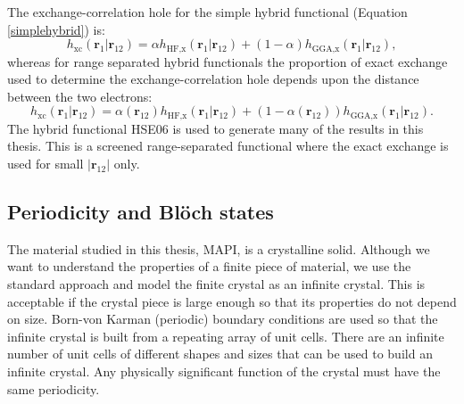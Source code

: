 The exchange-correlation hole for the simple hybrid functional (Equation \ref{simplehybrid}) is:\autocite{Henderson2008}
\begin{equation}
h_\mathrm{xc}(\mathbf{r}_1|\mathbf{r}_{12}) = \alpha h_{\textrm{HF,x}}(\mathbf{r}_1|\mathbf{r}_{12})+ \left(1-\alpha\right)h_{\textrm{GGA,x}}(\mathbf{r}_1|\mathbf{r}_{12}),
\end{equation}
whereas for range separated hybrid functionals the proportion of exact exchange used to determine the exchange-correlation hole depends upon the distance between the two electrons:\autocite{Henderson2008}
\begin{equation}
h_\mathrm{xc}(\mathbf{r}_1|\mathbf{r}_{12}) = \alpha(\mathbf{r}_{12}) h_{\textrm{HF,x}}(\mathbf{r}_1|\mathbf{r}_{12})+ \left(1-\alpha(\mathbf{r}_{12})\right)h_{\textrm{GGA,x}}(\mathbf{r}_1|\mathbf{r}_{12}).
\end{equation}
The hybrid functional HSE06\autocite{Heyd2003} is used to generate many of the results in this thesis. This is a screened range-separated functional where the exact exchange is used for small $\lvert\mathbf{r}_{12}\rvert$ only. 

%

\subsection{Periodicity and Bl\"{o}ch states} \label{periodicitysubsection}

The material studied in this thesis, MAPI, is a crystalline solid. Although we want to understand the properties of a finite piece of material, we use the standard approach and model the finite crystal as an infinite crystal. This is acceptable if the crystal piece is large enough so that its properties do not depend on size. Born-von Karman (periodic) boundary conditions are used so that the infinite crystal is built from a repeating array of unit cells. There are an infinite number of unit cells of different shapes and sizes that can be used to build an infinite crystal. Any physically significant function of the crystal must have the same periodicity.

